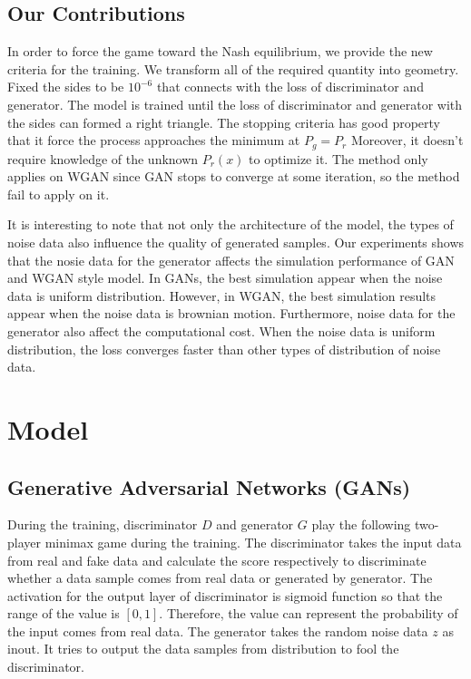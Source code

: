 \documentclass{article}
\begin{document}
		

		\subsection{Our Contributions}
		
		
		In order to force the game toward the Nash equilibrium, we provide the new criteria for the training. 
		We transform all of the required quantity into geometry.
		Fixed the sides to be $10^{-6}$ that connects with the loss of discriminator and generator.
		The model is trained until the loss of discriminator and generator with the sides can formed a right triangle.
		The stopping criteria has good property that it force the process approaches the minimum at $P_g = P_r$
		Moreover, it doesn't require knowledge of the unknown $P_r(x)$ to optimize it.
		The method only applies on WGAN since
		GAN stops to converge at some iteration, so the method fail to apply on it. 
		
		It is interesting to note that not only the architecture of the model, the types of noise data also influence the quality of generated samples.
		Our experiments shows that the nosie data for the generator affects the simulation performance of GAN and WGAN style model. 
		In GANs, the best simulation appear when the noise data is uniform distribution. 
		However, in WGAN, the best simulation results appear when the noise data is brownian motion.
		Furthermore, noise data for the generator also affect the computational cost. 
		When the noise data is uniform distribution, the loss converges faster than other types of distribution of noise data.
		
		
		
	\section{Model}
	\subsection{Generative Adversarial Networks (GANs)}
	
	During the training, discriminator $D$ and generator $G$ play the following two-player minimax game during the training. 
	 The discriminator takes the input data from real and fake data and calculate the score respectively to discriminate whether a data sample comes from real data or generated by generator. 
	 The activation for the output layer of discriminator is sigmoid function  so that the range of the value is $[0,1]$. 
	 Therefore, the value can represent the probability of the input comes from real data.  
	 The generator takes the random noise data $z$ as inout.
	 It tries to output the data samples from distribution to fool the discriminator.
	 
\end{document}
